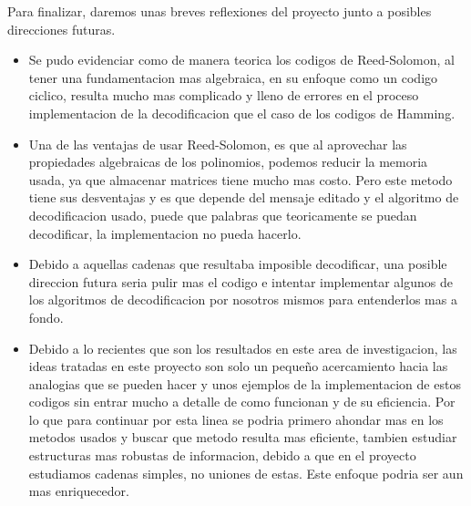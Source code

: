 Para finalizar, daremos unas breves reflexiones del proyecto junto a posibles direcciones futuras.
\begin{itemize}
    \item Se pudo evidenciar como de manera teorica los codigos de Reed-Solomon, al tener una fundamentacion mas algebraica, en su enfoque como un codigo ciclico, resulta mucho mas complicado y lleno de errores en el proceso implementacion de la decodificacion que el caso de los codigos de Hamming.
    \item Una de las ventajas de usar Reed-Solomon, es que al aprovechar las propiedades algebraicas de los polinomios, podemos reducir la memoria usada, ya que almacenar matrices tiene mucho mas costo. Pero este metodo tiene sus desventajas y es que depende del mensaje editado y el algoritmo de decodificacion usado, puede que palabras que teoricamente se puedan decodificar, la implementacion no pueda hacerlo.
    \item Debido a aquellas cadenas que resultaba imposible decodificar, una posible direccion futura seria pulir mas el codigo e intentar implementar algunos de los algoritmos de decodificacion por nosotros mismos para entenderlos mas a fondo.
    \item Debido a lo recientes que son los resultados en este area de investigacion, las ideas tratadas en este proyecto son solo un pequeño acercamiento hacia las analogias que se pueden hacer y unos ejemplos de la implementacion de estos codigos sin entrar mucho a detalle de como funcionan y de su eficiencia. Por lo que para continuar por esta linea se podria primero ahondar mas en los metodos usados y buscar que metodo resulta mas eficiente, tambien estudiar estructuras mas robustas de informacion, debido a que en el proyecto estudiamos cadenas simples, no uniones de estas. Este enfoque podria ser aun mas enriquecedor.
\end{itemize}